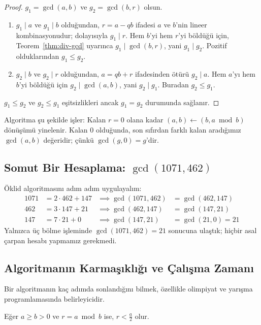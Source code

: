 \begin{proof}
$g_1 = \gcd(a, b)$ ve $g_2 = \gcd(b, r)$ olsun.
\begin{enumerate}
    \item $g_1 \mid a$ ve $g_1 \mid b$ olduğundan, $r = a - qb$ ifadesi $a$ ve $b$'nin lineer kombinasyonudur; dolayısıyla $g_1 \mid r$. Hem $b$'yi hem $r$'yi böldüğü için, Teorem~\ref{thm:div-gcd} uyarınca $g_1 \mid \gcd(b, r)$, yani $g_1 \mid g_2$. Pozitif olduklarından $g_1 \le g_2$.
    \item $g_2 \mid b$ ve $g_2 \mid r$ olduğundan, $a = qb + r$ ifadesinden ötürü $g_2 \mid a$. Hem $a$'yı hem $b$'yi böldüğü için $g_2 \mid \gcd(a, b)$, yani $g_2 \mid g_1$. Buradan $g_2 \le g_1$.
\end{enumerate}
$g_1 \le g_2$ ve $g_2 \le g_1$ eşitsizlikleri ancak $g_1 = g_2$ durumunda sağlanır.
\end{proof}

Algoritma şu şekilde işler: Kalan $r = 0$ olana kadar $(a, b) \leftarrow (b, a \bmod b)$ dönüşümü yinelenir. Kalan $0$ olduğunda, son sıfırdan farklı kalan aradığımız $\gcd(a, b)$ değeridir; çünkü $\gcd(g, 0) = g$'dir.

\subsection*{Somut Bir Hesaplama: $\gcd(1071, 462)$}

Öklid algoritmasını adım adım uygulayalım:
\begin{align*}
    1071 &= 2 \cdot 462 + 147 &\implies \gcd(1071, 462) &= \gcd(462, 147) \\
    462 &= 3 \cdot 147 + 21   &\implies \gcd(462, 147)  &= \gcd(147, 21) \\
    147 &= 7 \cdot 21 + 0     &\implies \gcd(147, 21)   &= \gcd(21, 0) = 21
\end{align*}
Yalnızca üç bölme işleminde $\gcd(1071, 462) = 21$ sonucuna ulaştık; hiçbir asal çarpan hesabı yapmamız gerekmedi.

\subsection*{Algoritmanın Karmaşıklığı ve Çalışma Zamanı}

Bir algoritmanın kaç adımda sonlandığını bilmek, özellikle olimpiyat ve yarışma programlamasında belirleyicidir.

\begin{theorem}
Eğer $a \ge b > 0$ ve $r = a \bmod b$ ise, $r < \frac{a}{2}$ olur.
\end{theorem}

